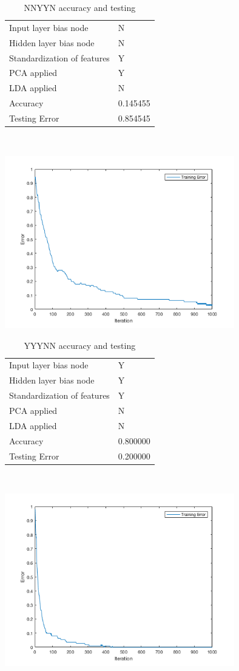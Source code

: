 \documentclass[12pt]{article}
\newcommand{\accuracyAndTestErrorTable}[8]{
  \begin{tabular}{l|l}
    \hline
    Input layer bias node & #1 \\
    Hidden layer bias node & #2 \\
    Standardization of features & #3 \\
    PCA applied & #4 \\
    LDA applied & #5 \\
    \hline
    Accuracy & #6 \\
    Testing Error & #7 \\
    \hline
  \end{tabular}
  ~\\[60pt]
  \caption{#8}
}
\begin{document}


\begin{center}
  \begin{table}[H]
    \begin{varwidth}[b]{0.4\linewidth}
      \centering
      \accuracyAndTestErrorTable{N}{N}{Y}{Y}{N}{0.145455}{0.854545}{NNYYN accuracy and testing}
      \label{table:NNYYN}
    \end{varwidth}%
    \hfill
    \begin{minipage}[b]{0.6\linewidth}
      \centering
      \includegraphics[width=100mm]{NNYYN_training_error.png}
      \label{fig:NNYYN}
    \end{minipage}
  \end{table}
\end{center}




\begin{center}
  \begin{table}[H]
    \begin{varwidth}[b]{0.4\linewidth}
      \centering
      \accuracyAndTestErrorTable{Y}{Y}{Y}{N}{N}{0.800000}{0.200000}{YYYNN accuracy and testing}
      \label{table:YYYNN}
    \end{varwidth}%
    \hfill
    \begin{minipage}[b]{0.6\linewidth}
      \centering
      \includegraphics[width=100mm]{YYYNN_training_error.png}
      \label{fig:YYYNN}
    \end{minipage}
  \end{table}
\end{center}
\end{document}
